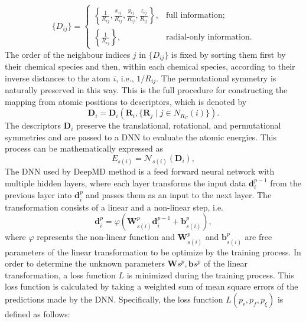 \begin{equation}
  \{D_{ij}\} = \begin{cases}
    \left\{
      \frac{1}{R_{ij}},
      \frac{x_{ij}}{R_{ij}},
      \frac{y_{ij}}{R_{ij}},
      \frac{z_{ij}}{R_{ij}}
    \right\}, & \text{full information;} \\
    \left\{\frac{1}{R_{ij}}\right\}, & \text{radial-only information.}
  \end{cases}
  \label{eq:descriptor}
\end{equation}
The order of the neighbour indices $j$ in $\{D_{ij}\}$ is fixed by sorting
them first by their chemical species and then, within each chemical species,
according to their inverse distances to the atom $i$, i.e., $1/R_{ij}$. The
permutational symmetry is naturally preserved in this way. This is the full
procedure for constructing the mapping from atomic positions to descriptors,
which is denoted by
\begin{equation}
  \mathbf{D}_i = \mathbf{D}_i(
    \mathbf{R}_i, \{\mathbf{R}_j \mid j \in  N_{R_C}(i)\}
  ).
\end{equation}
The descriptors $\mathbf{D}_i$ preserve the translational, rotational, and
permutational symmetries and are passed to a DNN to evaluate the atomic
energies. This process can be mathematically expressed as
\begin{equation}
  E_{s(i)} = \mathcal{N}_{s(i)}(\mathbf{D}_{i}),
  \label{eq:dnn}
\end{equation}
The DNN used by DeepMD method is a feed forward neural network with multiple
hidden layers, where each layer transforms the input data $\mathbf{d}_i^{p-1}$
from the previous layer into $\mathbf{d}_i^{p}$ and passes them as an input
to the next layer. The transformation consists of a linear and a non-linear
step, i.e.
\begin{equation}
  \mathbf{d}_{i}^{p} = \varphi \left(
    \mathbf{W}_{s(i)}^p \mathbf{d}_i^{p-1} + \mathbf{b}^p_{s(i)}
  \right),
\end{equation}
where $\varphi$ represents the non-linear function and $\mathbf{W}_{s(i)}^p$
and $\mathbf{b}^p_{s(i)}$ are free parameters of the linear transformation to
be optimize by the training process. In order to determine the unknown
parameters ${\mathbf{W}{s}^p, \mathbf{b}s^p}$ of the linear transformation, a
loss function $L$ is minimized during the training process. This loss
function is calculated by taking a weighted sum of mean square errors of the
predictions made by the DNN. Specifically, the loss function
$L(p_\epsilon, p_f, p_\xi)$ is defined as follows:
